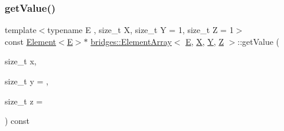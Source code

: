 \subsubsection{\texorpdfstring{getValue()}{getValue()}\hspace{0.1cm}{\footnotesize\ttfamily [2/2]}}
{\footnotesize\ttfamily template$<$typename E , size\+\_\+t X, size\+\_\+t Y = 1, size\+\_\+t Z = 1$>$ \\
const \mbox{\hyperlink{classbridges_1_1_element}{Element}}$<$\mbox{\hyperlink{namespacebridges_acfb0a4f7877d8f63de3e6862004c50eda3a3ea00cfc35332cedf6e5e9a32e94da}{E}}$>$$\ast$ \mbox{\hyperlink{classbridges_1_1_element_array}{bridges\+::\+Element\+Array}}$<$ \mbox{\hyperlink{namespacebridges_acfb0a4f7877d8f63de3e6862004c50eda3a3ea00cfc35332cedf6e5e9a32e94da}{E}}, \mbox{\hyperlink{namespacebridges_acfb0a4f7877d8f63de3e6862004c50eda02129bb861061d1a052c592e2dc6b383}{X}}, \mbox{\hyperlink{namespacebridges_acfb0a4f7877d8f63de3e6862004c50eda57cec4137b614c87cb4e24a3d003a3e0}{Y}}, \mbox{\hyperlink{namespacebridges_acfb0a4f7877d8f63de3e6862004c50eda21c2e59531c8710156d34a3c30ac81d5}{Z}} $>$\+::get\+Value (\begin{DoxyParamCaption}\item[{size\+\_\+t}]{x,  }\item[{size\+\_\+t}]{y = {},  }\item[{size\+\_\+t}]{z = {} }\end{DoxyParamCaption}) const\hspace{0.3cm}{\ttfamily [inline]}}

\mbox{\label{classbridges_1_1_element_array_a202def849cd345d8b56ebcb31f332d25}} 
